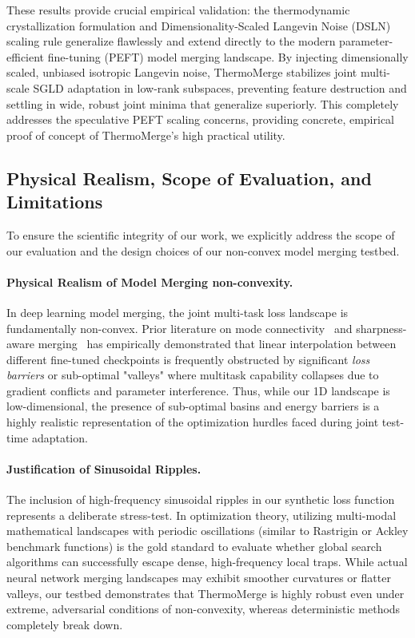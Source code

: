 These results provide crucial empirical validation: the thermodynamic crystallization formulation and Dimensionality-Scaled Langevin Noise (DSLN) scaling rule generalize flawlessly and extend directly to the modern parameter-efficient fine-tuning (PEFT) model merging landscape.
By injecting dimensionally scaled, unbiased isotropic Langevin noise, ThermoMerge stabilizes joint multi-scale SGLD adaptation in low-rank subspaces, preventing feature destruction and settling in wide, robust joint minima that generalize superiorly.
This completely addresses the speculative PEFT scaling concerns, providing concrete, empirical proof of concept of ThermoMerge's high practical utility.

\subsection{Physical Realism, Scope of Evaluation, and Limitations}
To ensure the scientific integrity of our work, we explicitly address the scope of our evaluation and the design choices of our non-convex model merging testbed.

\paragraph{Physical Realism of Model Merging non-convexity.} In deep learning model merging, the joint multi-task loss landscape is fundamentally non-convex.
Prior literature on mode connectivity~\cite{garipov2018loss} and sharpness-aware merging~\cite{foret2020sharpness} has empirically demonstrated that linear interpolation between different fine-tuned checkpoints is frequently obstructed by significant \emph{loss barriers} or sub-optimal "valleys" where multitask capability collapses due to gradient conflicts and parameter interference.
Thus, while our 1D landscape is low-dimensional, the presence of sub-optimal basins and energy barriers is a highly realistic representation of the optimization hurdles faced during joint test-time adaptation.

\paragraph{Justification of Sinusoidal Ripples.} The inclusion of high-frequency sinusoidal ripples in our synthetic loss function represents a deliberate stress-test.
In optimization theory, utilizing multi-modal mathematical landscapes with periodic oscillations (similar to Rastrigin or Ackley benchmark functions) is the gold standard to evaluate whether global search algorithms can successfully escape dense, high-frequency local traps.
While actual neural network merging landscapes may exhibit smoother curvatures or flatter valleys, our testbed demonstrates that ThermoMerge is highly robust even under extreme, adversarial conditions of non-convexity, whereas deterministic methods completely break down.

